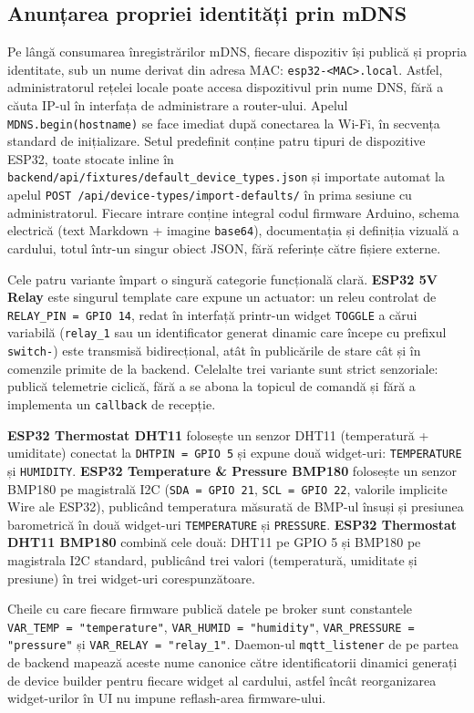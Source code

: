 \subsection{Anunțarea propriei identități prin mDNS}
Pe lângă consumarea înregistrărilor mDNS, fiecare dispozitiv își publică și propria identitate, sub un nume derivat din adresa MAC: \texttt{esp32-<MAC>.local}. Astfel, administratorul rețelei locale poate accesa dispozitivul prin nume DNS, fără a căuta IP-ul în interfața de administrare a router-ului. Apelul \texttt{MDNS.begin(hostname)} se face imediat după conectarea la Wi-Fi, în secvența standard de inițializare.
Setul predefinit conține patru tipuri de dispozitive ESP32, toate stocate inline în \texttt{backend/api/fixtures/default\_device\_types.json} și importate automat la apelul \texttt{POST /api/device-types/import-defaults/} în prima sesiune cu administratorul. Fiecare intrare conține integral codul firmware Arduino, schema electrică (text Markdown + imagine \texttt{base64}), documentația și definiția vizuală a cardului, totul într-un singur obiect JSON, fără referințe către fișiere externe.

Cele patru variante împart o singură categorie funcțională clară. \textbf{ESP32 5V Relay} este singurul template care expune un actuator: un releu controlat de \texttt{RELAY\_PIN = GPIO 14}, redat în interfață printr-un widget \texttt{TOGGLE} a cărui variabilă (\texttt{relay\_1} sau un identificator generat dinamic care începe cu prefixul \texttt{switch-}) este transmisă bidirecțional, atât în publicările de stare cât și în comenzile primite de la backend. Celelalte trei variante sunt strict senzoriale: publică telemetrie ciclică, fără a se abona la topicul de comandă și fără a implementa un \texttt{callback} de recepție.

\textbf{ESP32 Thermostat DHT11} folosește un senzor DHT11 (temperatură + umiditate) conectat la \texttt{DHTPIN = GPIO 5} și expune două widget-uri: \texttt{TEMPERATURE} și \texttt{HUMIDITY}. \textbf{ESP32 Temperature \& Pressure BMP180} folosește un senzor BMP180 pe magistrală I2C (\texttt{SDA = GPIO 21}, \texttt{SCL = GPIO 22}, valorile implicite Wire ale ESP32), publicând temperatura măsurată de BMP-ul însuși și presiunea barometrică în două widget-uri \texttt{TEMPERATURE} și \texttt{PRESSURE}. \textbf{ESP32 Thermostat DHT11 BMP180} combină cele două: DHT11 pe GPIO 5 și BMP180 pe magistrala I2C standard, publicând trei valori (temperatură, umiditate și presiune) în trei widget-uri corespunzătoare.

Cheile cu care fiecare firmware publică datele pe broker sunt constantele \texttt{VAR\_TEMP = "temperature"}, \texttt{VAR\_HUMID = "humidity"}, \texttt{VAR\_PRESSURE = "pressure"} și \texttt{VAR\_RELAY = "relay\_1"}. Daemon-ul \texttt{mqtt\_listener} de pe partea de backend mapează aceste nume canonice către identificatorii dinamici generați de device builder pentru fiecare widget al cardului, astfel încât reorganizarea widget-urilor în UI nu impune reflash-area firmware-ului.

